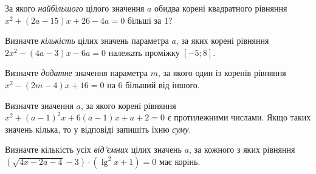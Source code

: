 \documentclass[12pt]{article}
\begin{document}
\begin{samepage}
\noindent\zadnum За якого \textit{найбільшого} цілого значення $a$ обидва корені квадратного рівняння $x^2 + (2a - 15)x + 26 - 4a = 0$ більші за 1? 

\nmtnobreak
\nopagebreak\nbvspace{0.3cm}
\nmtAnswerBox
\par{}
\end{samepage}

\begin{samepage}
\noindent\zadnum Визначте \textit{кількість} цілих значень параметра $a$, за яких корені рівняння $2x^2 - (4a - 3)x - 6a = 0$ належать проміжку $[-5; 8]$. 

\nmtnobreak
\nopagebreak\nbvspace{0.3cm}
\nmtAnswerBox
\par{}
\end{samepage}

\begin{samepage}
\noindent\zadnum Визначте \textit{додатне} значення параметра $m$, за якого один із коренів рівняння $x^2 - (2m - 4)x + 16 = 0$ на 6 більший від іншого. 

\nmtnobreak
\nopagebreak\nbvspace{0.3cm}
\nmtAnswerBox
\par{}
\end{samepage}

\begin{samepage}
\noindent\zadnum Визначте значення $a$, за якого корені рівняння $x^2 + (a - 1)^2x + 6(a - 1)x + a + 2 = 0$ є протилежними числами. Якщо таких значень кілька, то у відповіді запишіть їхню \textit{суму}. 

\nmtnobreak
\nopagebreak\nbvspace{0.3cm}
\nmtAnswerBox
\par{}
\end{samepage}

\begin{samepage}
\noindent\zadnum Визначте кількість усіх \textit{від'ємних} цілих значень $a$, за кожного з яких рівняння $(\sqrt{4x - 2a - 4} - 3) \cdot (\lg^2 x + 1) = 0$ має корінь. 

\nmtnobreak
\nopagebreak\nbvspace{0.3cm}
\nmtAnswerBox
\par{}
\end{samepage}
\end{document}

